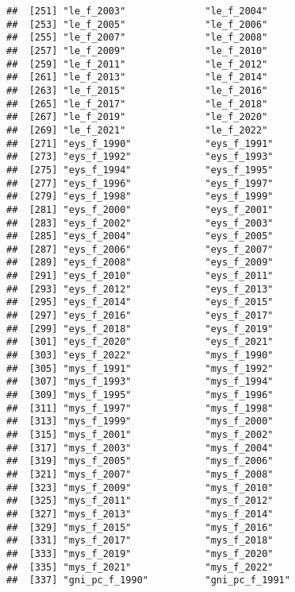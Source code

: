 \documentclass[
]{article}
\begin{document}
\begin{verbatim}
##  [251] "le_f_2003"              "le_f_2004"             
##  [253] "le_f_2005"              "le_f_2006"             
##  [255] "le_f_2007"              "le_f_2008"             
##  [257] "le_f_2009"              "le_f_2010"             
##  [259] "le_f_2011"              "le_f_2012"             
##  [261] "le_f_2013"              "le_f_2014"             
##  [263] "le_f_2015"              "le_f_2016"             
##  [265] "le_f_2017"              "le_f_2018"             
##  [267] "le_f_2019"              "le_f_2020"             
##  [269] "le_f_2021"              "le_f_2022"             
##  [271] "eys_f_1990"             "eys_f_1991"            
##  [273] "eys_f_1992"             "eys_f_1993"            
##  [275] "eys_f_1994"             "eys_f_1995"            
##  [277] "eys_f_1996"             "eys_f_1997"            
##  [279] "eys_f_1998"             "eys_f_1999"            
##  [281] "eys_f_2000"             "eys_f_2001"            
##  [283] "eys_f_2002"             "eys_f_2003"            
##  [285] "eys_f_2004"             "eys_f_2005"            
##  [287] "eys_f_2006"             "eys_f_2007"            
##  [289] "eys_f_2008"             "eys_f_2009"            
##  [291] "eys_f_2010"             "eys_f_2011"            
##  [293] "eys_f_2012"             "eys_f_2013"            
##  [295] "eys_f_2014"             "eys_f_2015"            
##  [297] "eys_f_2016"             "eys_f_2017"            
##  [299] "eys_f_2018"             "eys_f_2019"            
##  [301] "eys_f_2020"             "eys_f_2021"            
##  [303] "eys_f_2022"             "mys_f_1990"            
##  [305] "mys_f_1991"             "mys_f_1992"            
##  [307] "mys_f_1993"             "mys_f_1994"            
##  [309] "mys_f_1995"             "mys_f_1996"            
##  [311] "mys_f_1997"             "mys_f_1998"            
##  [313] "mys_f_1999"             "mys_f_2000"            
##  [315] "mys_f_2001"             "mys_f_2002"            
##  [317] "mys_f_2003"             "mys_f_2004"            
##  [319] "mys_f_2005"             "mys_f_2006"            
##  [321] "mys_f_2007"             "mys_f_2008"            
##  [323] "mys_f_2009"             "mys_f_2010"            
##  [325] "mys_f_2011"             "mys_f_2012"            
##  [327] "mys_f_2013"             "mys_f_2014"            
##  [329] "mys_f_2015"             "mys_f_2016"            
##  [331] "mys_f_2017"             "mys_f_2018"            
##  [333] "mys_f_2019"             "mys_f_2020"            
##  [335] "mys_f_2021"             "mys_f_2022"            
##  [337] "gni_pc_f_1990"          "gni_pc_f_1991"         

\end{verbatim}
\end{document}
